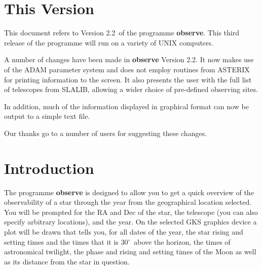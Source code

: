 \documentclass[11pt]{article}
\newcommand{\stardocinitials}  {SUN}
\newcommand{\stardocnumber}    {146.4}
\newcommand{\stardocversion}   {Version 2.2}
\newcommand{\stardocabstract}  {[Text of abstract]}
\newcommand{\stardocname}{\stardocinitials /\stardocnumber}
\newenvironment{latexonly}{}{}
\newcommand{\xlabel}[1]{}
\newcommand{\latexonlytoc}[0]{\tableofcontents}
\newcommand{\degrees}{\hbox{$^\circ$}}
\newcommand{\degrees}{{\rawhtml &deg;}}
\begin{document}
 \begin{latexonly}
   \setlength{\parskip}{0mm}
   \latexonlytoc
   \setlength{\parskip}{\medskipamount}
   \markright{\stardocname}
 \end{latexonly}
\newpage

\section{\xlabel{VERSION}This Version}
\label{sec:version}

This document refers to \stardocversion\ of the programme {\bf{observe}}.
This third release of the programme will run on a variety of UNIX
computers.

A number of changes have been made in {\bf{observe}} \stardocversion.
It now makes use of the ADAM parameter system and does not employ
routines from {\sc ASTERIX} for printing information to the screen. It
also presents the user with the full list of telescopes from SLALIB,
allowing a wider choice of pre-defined observing sites. 

In addition, much of the information displayed in graphical format 
can now be output to a simple text file.

Our thanks go to a number of users for suggesting these changes.

\section{\xlabel{INTRODUCTION}Introduction}
\label{sec:introduction}

The programme {\bf{observe}} is designed to allow you to get a quick
overview of the observability of a star through the year from the
geographical location selected. You will be prompted for the RA and Dec
of the star, the telescope (you can also specify arbitrary locations),
and the year. On the selected GKS graphics device a plot will be drawn
that tells you, for all dates of the year, the star rising and setting
times and the times that it is 30\degrees\ above the  horizon, the
times of astronomical twilight, the phase and rising and setting  times
of the Moon as well as its distance from the star in question.
\end{document}
